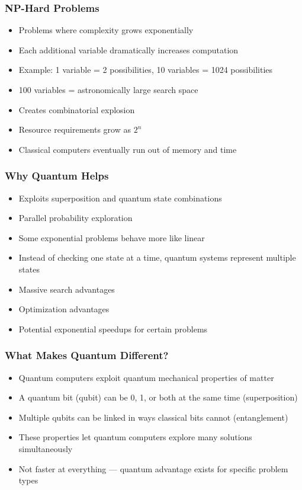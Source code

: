 \begin{frame}[fragile]\frametitle{NP-Hard Problems}
\begin{itemize}
\item Problems where complexity grows exponentially
\item Each additional variable dramatically increases computation
\item Example: 1 variable = 2 possibilities, 10 variables = 1024 possibilities
\item 100 variables = astronomically large search space
\item Creates combinatorial explosion
\item Resource requirements grow as $2^n$
\item Classical computers eventually run out of memory and time
\end{itemize}
\end{frame}

\begin{frame}[fragile]\frametitle{Why Quantum Helps}
\begin{itemize}
\item Exploits superposition and quantum state combinations
\item Parallel probability exploration
\item Some exponential problems behave more like linear
\item Instead of checking one state at a time, quantum systems represent multiple states
\item Massive search advantages
\item Optimization advantages
\item Potential exponential speedups for certain problems
\end{itemize}
\end{frame}

\begin{frame}[fragile]\frametitle{What Makes Quantum Different?}
\begin{itemize}
\item Quantum computers exploit quantum mechanical properties of matter
\item A quantum bit (qubit) can be 0, 1, or both at the same time (superposition)
\item Multiple qubits can be linked in ways classical bits cannot (entanglement)
\item These properties let quantum computers explore many solutions simultaneously
\item Not faster at everything --- quantum advantage exists for specific problem types
\end{itemize}
\end{frame}


